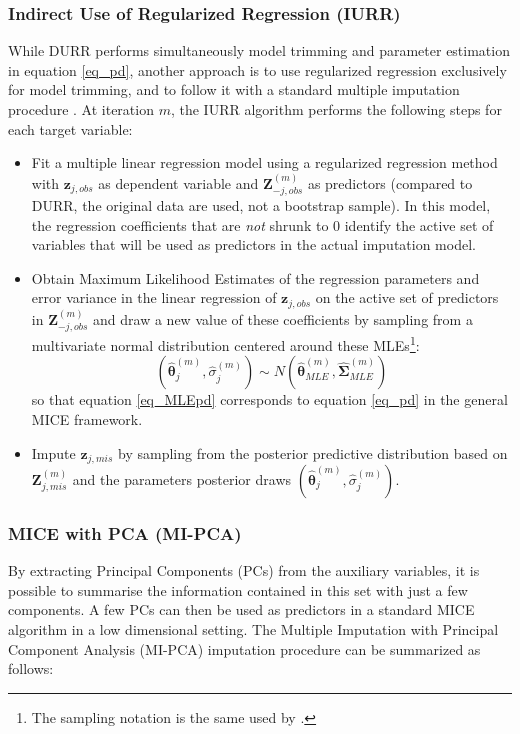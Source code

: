 \subsubsection{Indirect Use of Regularized Regression (IURR)}
	While DURR performs simultaneously model trimming and parameter estimation in equation \eqref{eq_pd}, 
	another approach is to use regularized regression exclusively for model trimming, and to follow it 
	with a standard multiple imputation procedure \citep{zhaoLong:2016, dengEtAl:2016}.
	At iteration $m$, the IURR algorithm performs the following steps for each target variable:
%
	\begin{itemize}
%
	\item Fit a multiple linear regression model using a regularized regression method with $\bm{z}_{j,obs}$ as 
		dependent variable and $\bm{Z}_{-j,obs}^{(m)}$ as predictors (compared to DURR, the original data are 
		used, not a bootstrap sample).
		In this model, the regression coefficients that are \emph{not} shrunk to 0 identify the active 
		set of variables that will be used as predictors in the actual imputation model.
	
	\item Obtain Maximum Likelihood Estimates of the regression parameters and error variance in the linear
		regression of $\bm{z}_{j,obs}$ on the active set of predictors in $\bm{Z}_{-j,obs}^{(m)}$ and
		draw a new value of these coefficients by sampling from a multivariate normal distribution
		centered around these MLEs\footnote{The sampling notation is the same used by \cite{dengEtAl:2016}.}:
%
		\begin{equation}\label{eq_MLEpd}
		(\hat{\bm{\theta}}_{j}^{(m)}, \hat{\sigma}_{j}^{(m)}) \sim N(\hat{\bm{\theta}}_{MLE}^{(m)}, 
			\hat{\bm{\Sigma}}_{MLE}^{(m)})
		\end{equation}
%
		so that equation \eqref{eq_MLEpd} corresponds to equation \eqref{eq_pd} in the general MICE framework.

	\item Impute $\bm{z}_{j,mis}$ by sampling from the posterior predictive distribution based 
		on $\bm{Z}_{j,mis}^{(m)}$ and the parameters posterior draws $(\hat{\bm{\theta}}_{j}^{(m)}, 
		\hat{\sigma}_{j}^{(m)})$.
%
	\end{itemize}

\subsubsection{MICE with PCA (MI-PCA)}
	By extracting Principal Components (PCs) from the auxiliary variables, it is possible to summarise the information 
	contained in this set with just a few components.
	A few PCs can then be used as predictors in a standard MICE algorithm in a low dimensional setting.
	The Multiple Imputation with Principal Component Analysis (MI-PCA) imputation procedure can be summarized as follows:

